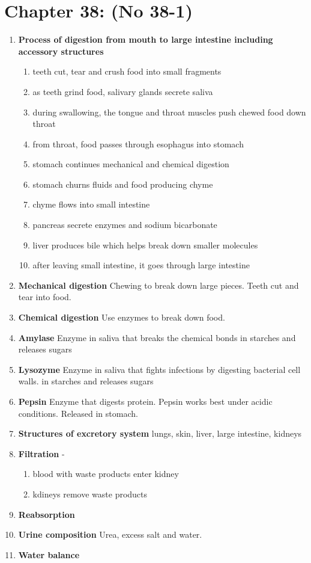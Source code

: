 \documentclass[9pt]{article}
\begin{document}
\section*{Chapter 38: (No 38-1)}
\begin{enumerate}
  \item {\bf Process of digestion from mouth to large intestine including accessory structures}
  \begin{enumerate}
    \item teeth cut, tear and crush food into small fragments
    \item as teeth grind food, salivary glands secrete saliva
    \item during swallowing, the tongue and throat muscles push chewed food down throat
    \item from throat, food passes through esophagus into stomach
    \item stomach continues mechanical and chemical digestion
    \item stomach churns fluids and food producing chyme
    \item chyme flows into small intestine
    \item pancreas secrete enzymes and sodium bicarbonate 
    \item liver produces bile which helps break down smaller molecules
    \item after leaving small intestine, it goes through large intestine
  \end{enumerate}
  \item {\bf Mechanical digestion} Chewing to break down large
    pieces. Teeth cut and tear into food.
  \item {\bf Chemical digestion}  Use enzymes to break down food.
  \item {\bf Amylase} Enzyme in saliva that breaks the chemical bonds
    in starches and releases sugars
  \item {\bf Lysozyme} Enzyme in saliva that fights infections by
    digesting bacterial cell walls.  in starches and releases sugars
  \item {\bf Pepsin} Enzyme that digests protein. Pepsin works best
    under acidic conditions. Released in stomach.
  \item {\bf Structures of excretory system} lungs, skin, liver, large intestine, kidneys
  \item {\bf Filtration} -
\begin{enumerate}
  \item blood with waste products enter kidney
  \item kdineys remove waste products
\end{enumerate}
  \item {\bf Reabsorption}
  \item {\bf Urine composition} Urea, excess salt and water.
  \item {\bf Water balance} 


\end{enumerate}
\end{document}
